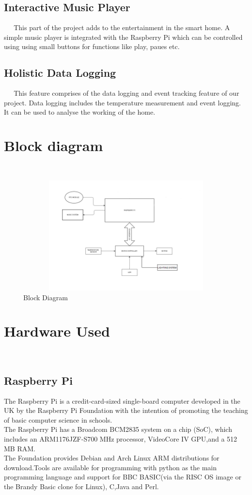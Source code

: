 \documentclass[12pt,a4paper,oneside]{report}
\begin{document}
\begin{onehalfspacing}
\subsection{Interactive Music Player}
{$\;\;\;\;$}
This part of the project adds to the entertainment in the smart home. A simple music player is integrated with the Raspberry Pi which can be controlled using using small buttons for functions like play, paues etc.

\subsection{Holistic Data Logging}
{$\;\;\;\;$}
This feature comprises of the data logging and event tracking feature of our project. Data logging includes the temperature measurement and event logging. It can be used to analyse the working of the home.

\newpage
\section{Block diagram}
{$\;\;\;\;$}
\begin{figure}[h]
\includegraphics[width=15cm, height=6cm]{ABC.png}
\centering
\caption{Block Diagram}
\label{fig1}
\end{figure}



\section{Hardware Used}
{$\;\;\;\;$}
\subsection{Raspberry Pi}
The Raspberry Pi is a credit-card-sized single-board computer developed in the UK by the Raspberry Pi Foundation with the intention of promoting the teaching of basic computer science in schools.
\\The Raspberry Pi has a Broadcom BCM2835 system on a chip (SoC), which includes an ARM1176JZF-S700 MHz processor, VideoCore IV GPU,and a 512 MB RAM.\\
The Foundation provides Debian and Arch Linux ARM distributions for download.Tools are available for programming with python as the main programming language and support for BBC BASIC(via the RISC OS image or the Brandy Basic clone for Linux), C,Java and Perl.



\end{onehalfspacing}
\end{document}
